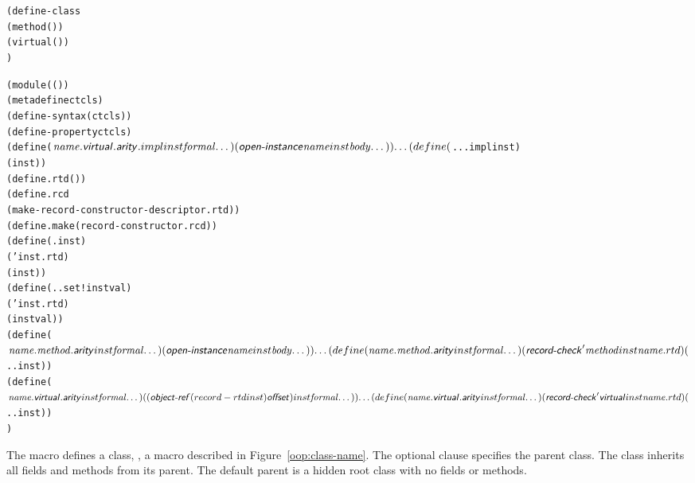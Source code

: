 \begin{syntax}\begin{alltt}
(define-class 
  (method (  \etc)  \etc) \etc
  (virtual (  \etc)  \etc) \etc
  )\strut\end{alltt}
\end{syntax}
\expandsto{}\begin{alltt}\antipar
(module ((  \etc))
  (meta define ctcls )
  (define-syntax  ( ctcls))
  (define-property   ctcls)
  (define ($\var{name}.\nl{virtual}.\nl{arity}.impl inst \var{formal} \etc)
    (\nl{open-instance} \var{name} inst \var{body} \etc)) \etc
  (define ($...impl inst  \etc)
    (  inst  \etc)) \etc
  (define .rtd ( ))
  (define .rcd
    (make-record-constructor-descriptor .rtd  ))
  (define .make (record-constructor .rcd))
  (define (. inst)
    ( ' inst .rtd)
    ( inst )) \etc
  (define (..set! inst val)
     ( ' inst .rtd)
     ( inst  val)) \etc
  (define ($\var{name}.\var{method}.\nl{arity} inst \var{formal} \etc)
    (\nl{open-instance} \var{name} inst \var{body} \etc)) \etc
  (define (\var{name}.\var{method}.\nl{arity} inst \var{formal} \etc)
    (\nl{record-check} '\var{method} inst \var{name}.rtd)
    ($.. inst  \etc)) \etc
  (define ($\var{name}.\nl{virtual}.\nl{arity} inst \var{formal} \etc)
    ((\nl{object-ref} (record-rtd inst) \nl{offset}) inst \var{formal} \etc)) \etc
  (define (\var{name}.\nl{virtual}.\nl{arity} inst \var{formal} \etc)
    (\nl{record-check} '\nl{virtual} inst \var{name}.rtd)
    ($.. inst  \etc)) \etc
  )\end{alltt}

The  macro defines a class, , a macro described in
Figure~\ref{oop:class-name}. The optional  clause specifies the parent
class. The class inherits all fields and methods from its parent. The default parent is a
hidden root class with no fields or methods.

